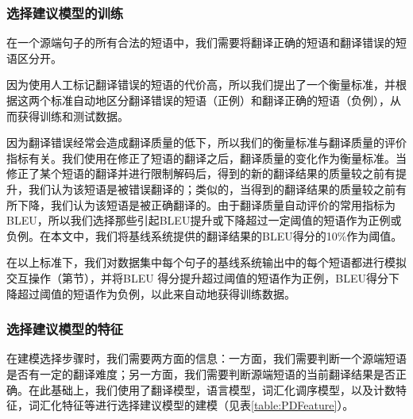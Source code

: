 \documentclass[master, winfont]{njuthesis}
\begin{document}
\subsubsection{选择建议模型的训练}
\label{section:psmtraining}
在一个源端句子的所有合法的短语中，我们需要将翻译正确的短语和翻译错误的短语区分开。

因为使用人工标记翻译错误的短语的代价高，所以我们提出了一个衡量标准，并根据这两个标准自动地区分翻译错误的短语（正例）和翻译正确的短语（负例），从而获得训练和测试数据。

因为翻译错误经常会造成翻译质量的低下，所以我们的衡量标准与翻译质量的评价指标有关。我们使用在修正了短语的翻译之后，翻译质量的变化作为衡量标准。当修正了某个短语的翻译并进行限制解码后，得到的新的翻译结果的质量较之前有提升，我们认为该短语是被错误翻译的；类似的，当得到的翻译结果的质量较之前有所下降，我们认为该短语是被正确翻译的。由于翻译质量自动评价的常用指标为BLEU，所以我们选择那些引起BLEU提升或下降超过一定阈值的短语作为正例或负例。在本文中，我们将基线系统提供的翻译结果的BLEU得分的10\%作为阈值。

在以上标准下，我们对数据集中每个句子的基线系统输出中的每个短语都进行模拟交互操作（第\label{sec:simulate}节），并将BLEU 得分提升超过阈值的短语作为正例，BLEU得分下降超过阈值的短语作为负例，以此来自动地获得训练数据。

\subsubsection{选择建议模型的特征}
\label{section:rsmtraining}
在建模选择步骤时，我们需要两方面的信息：一方面，我们需要判断一个源端短语是否有一定的翻译难度；另一方面，我们需要判断源端短语的当前翻译结果是否正确。在此基础上，我们使用了翻译模型，语言模型，词汇化调序模型，以及计数特征，词汇化特征等进行选择建议模型的建模（见表\ref{table:PDFeature}）。
\end{document}

